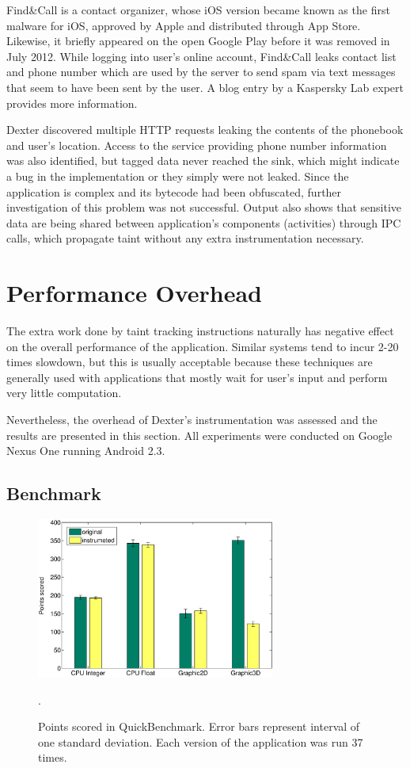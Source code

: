 \documentclass[12pt,twoside,notitlepage]{report}
\begin{document}
Find\&Call is a contact organizer, whose iOS version became known as the first malware for iOS, approved by Apple and distributed through App Store. Likewise, it briefly appeared on the open Google Play before it was removed in July 2012. While logging into user's online account, Find\&Call leaks contact list and phone number which are used by the server to send spam via text messages that seem to have been sent by the user. A blog entry\cite{report:FindAndCall} by a Kaspersky Lab expert provides more information.

Dexter discovered multiple HTTP requests leaking the contents of the phonebook and user's location. Access to the service providing phone number information was also identified, but tagged data never reached the sink, which might indicate a bug in the implementation or they simply were not leaked. Since the application is complex and its bytecode had been obfuscated, further investigation of this problem was not successful. Output also shows that sensitive data are being shared between application's components (activities) through IPC calls, which propagate taint without any extra instrumentation necessary.

\section{Performance Overhead}

The extra work done by taint tracking instructions naturally has negative effect on the overall performance of the application. Similar systems tend to incur 2-20 times slowdown\cite{Yin:2007:PCS:1315245.1315261, Chow:2004:UDL:1251375.1251397}, but this is usually acceptable because these techniques are generally used with applications that mostly wait for user's input and perform very little computation. 

Nevertheless, the overhead of Dexter's instrumentation was assessed and the results are presented in this section. All experiments were conducted on Google Nexus One running Android 2.3. 

\subsection{Benchmark}

\begin{figure}
	\centerline{
		\includegraphics[width=0.7\textwidth]{figs/fig_eval_quickbench.eps}
	}
	\caption{Points scored in QuickBenchmark. Error bars represent interval of one standard deviation. Each version of the application was run 37 times.}.
	\label{figure:Evalutaion_QuickBench}
\end{figure}
\end{document}

